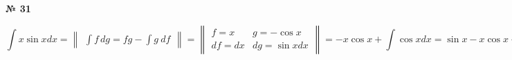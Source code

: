 \documentclass{article}
\begin{document}
\textbf{№ 31} 

$$ \int x\sin{x} dx 
= \begin{Vmatrix} \int f \,dg = fg - \int g \ df \end{Vmatrix} 
= \begin{Vmatrix} f = x   &  g = -\cos{x} \\
                 df = dx  & dg = \sin{x} dx \end{Vmatrix} 
= -x\cos{x} + \int \cos{x}dx
= \sin{x} - x\cos{x} + C $$
\end{document}
